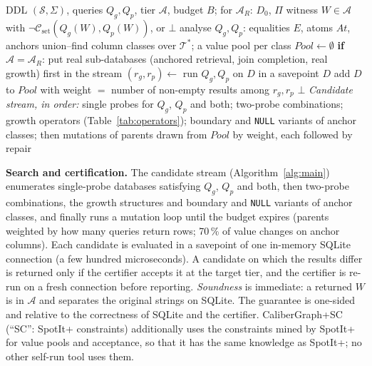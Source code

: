 \begin{algorithm}[t]
\caption{CaliberGraph (CaliberGraph-R adds line 4)}\label{alg:main}
\footnotesize
\begin{algorithmic}[1]
\Require DDL $(\mathcal S,\Sigma)$, queries $Q_g,Q_p$, tier $\mathcal A$, budget $B$; for $\mathcal A_R$: $D_0$, $\Pi$
\Ensure witness $W\in\mathcal A$ with $\neg\mathcal C_{\mathrm{set}}(Q_g(W),Q_p(W))$, or $\bot$
\State analyse $Q_g,Q_p$: equalities $E$, atoms $\mathit{At}$, anchors
\State union--find column classes over $\mathcal T^{*}$; a value pool per class
\State $\mathit{Pool}\gets\emptyset$
\State \textbf{if} $\mathcal A=\mathcal A_R$: put real sub-databases (anchored retrieval, join completion, real growth) first in the stream
  \State $(r_g,r_p)\gets$ run $Q_g,Q_p$ on $D$ in a savepoint
    \State \Return $D$ 
  \EndIf
  \State add $D$ to $\mathit{Pool}$ with weight $=$ number of non-empty results among $r_g,r_p$
\EndFor
\State \Return $\bot$
\Statex \emph{Candidate stream, in order:} single probes for $Q_g$, $Q_p$ and both; two-probe combinations; growth operators (Table~\ref{tab:operators}); boundary and \texttt{NULL} variants of anchor classes; then mutations of parents drawn from $\mathit{Pool}$ by weight, each followed by repair
\end{algorithmic}
\end{algorithm}

\textbf{Search and certification.} The candidate stream (Algorithm~\ref{alg:main}) enumerates single-probe databases satisfying $Q_g$, $Q_p$ and both, then two-probe combinations, the growth structures and boundary and \texttt{NULL} variants of anchor classes, and finally runs a mutation loop until the budget expires (parents weighted by how many queries return rows; 70\,\% of value changes on anchor columns). Each candidate is evaluated in a savepoint of one in-memory SQLite connection (a few hundred microseconds). A candidate on which the results differ is returned only if the certifier accepts it at the target tier, and the certifier is re-run on a fresh connection before reporting. \emph{Soundness} is immediate: a returned $W$ is in $\mathcal A$ and separates the original strings on SQLite. The guarantee is one-sided and relative to the correctness of SQLite and the certifier. CaliberGraph+SC (``SC'': SpotIt+ constraints) additionally uses the constraints mined by SpotIt+ for value pools and acceptance, so that it has the same knowledge as SpotIt+; no other self-run tool uses them.

